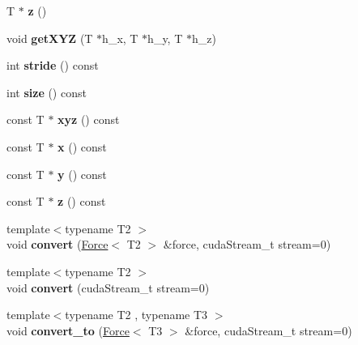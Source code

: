 \begin{DoxyCompactItemize}
\item 
\hypertarget{classForce_aa0e7e65ca991f39db681899df78a3453}{}\label{classForce_aa0e7e65ca991f39db681899df78a3453} 
T $\ast$ {\bfseries z} ()
\item 
\hypertarget{classForce_a6b5f678ada0787de43eaca4592253eb1}{}\label{classForce_a6b5f678ada0787de43eaca4592253eb1} 
void {\bfseries get\+X\+YZ} (T $\ast$h\+\_\+x, T $\ast$h\+\_\+y, T $\ast$h\+\_\+z)
\item 
\hypertarget{classForce_a4e69bf4415956865798825dc78543ad2}{}\label{classForce_a4e69bf4415956865798825dc78543ad2} 
int {\bfseries stride} () const
\item 
\hypertarget{classForce_ab991c5be68adf6b828aac668579a3585}{}\label{classForce_ab991c5be68adf6b828aac668579a3585} 
int {\bfseries size} () const
\item 
\hypertarget{classForce_aee3c12aff68e1c93efb69350b2d22d22}{}\label{classForce_aee3c12aff68e1c93efb69350b2d22d22} 
const T $\ast$ {\bfseries xyz} () const
\item 
\hypertarget{classForce_a32f507d36669148b02e3552bd0472a74}{}\label{classForce_a32f507d36669148b02e3552bd0472a74} 
const T $\ast$ {\bfseries x} () const
\item 
\hypertarget{classForce_a0a397f34e01245b47b6e64fd9538cb9b}{}\label{classForce_a0a397f34e01245b47b6e64fd9538cb9b} 
const T $\ast$ {\bfseries y} () const
\item 
\hypertarget{classForce_a99dfff042680ec86d2f3ef8f64ab623e}{}\label{classForce_a99dfff042680ec86d2f3ef8f64ab623e} 
const T $\ast$ {\bfseries z} () const
\item 
\hypertarget{classForce_aeac8fe3db213e73b225fef79376db402}{}\label{classForce_aeac8fe3db213e73b225fef79376db402} 
{\footnotesize template$<$typename T2 $>$ }\\void {\bfseries convert} (\hyperlink{classForce}{Force}$<$ T2 $>$ \&force, cuda\+Stream\+\_\+t stream=0)
\item 
\hypertarget{classForce_ae2d05124169c090bf895afa17580fc84}{}\label{classForce_ae2d05124169c090bf895afa17580fc84} 
{\footnotesize template$<$typename T2 $>$ }\\void {\bfseries convert} (cuda\+Stream\+\_\+t stream=0)
\item 
\hypertarget{classForce_a29464afd8594aba32e99b9024e90036b}{}\label{classForce_a29464afd8594aba32e99b9024e90036b} 
{\footnotesize template$<$typename T2 , typename T3 $>$ }\\void {\bfseries convert\+\_\+to} (\hyperlink{classForce}{Force}$<$ T3 $>$ \&force, cuda\+Stream\+\_\+t stream=0)

\end{DoxyCompactItemize}
